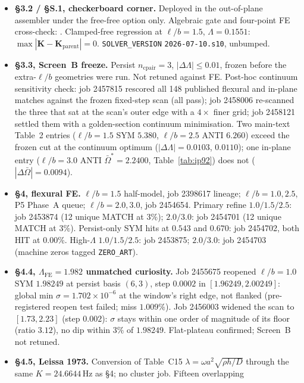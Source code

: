\documentclass[11pt]{article}
\begin{document}
\begin{itemize}\itemsep2pt
\item \textbf{\S3.2 / \S{}S.1, checkerboard corner.} Deployed in the
out-of-plane assembler under the free-free option only. Algebraic gate
and four-point FE cross-check:
. Clamped-free
regression at $\ell/b=1.5$, $\Lambda=0.1551$:
$\max|\mathbf{K}-\mathbf{K}_{\mathrm{parent}}|=0$.
\texttt{SOLVER\_VERSION} \texttt{2026-07-10.s10}, unbumped.
\item \textbf{\S3.3, Screen~B freeze.} Persist $n_{\mathrm{cpair}}=3$,
$|\Delta\Lambda|\le 0.01$, frozen before the extra-$\ell/b$ geometries
were run. Not retuned against FE. Post-hoc continuum sensitivity check:
job 2457815 rescored all 148 published flexural and in-plane matches
against the frozen fixed-step scan (all pass); job 2458006 re-scanned
the three that sat at the scan's outer edge with a $4\times$ finer grid;
job 2458121 settled them with a golden-section continuum minimisation.
Two main-text Table~2 entries ($\ell/b=1.5$ SYM $5.380$,
$\ell/b=2.5$ ANTI $6.260$) exceed the frozen cut at the continuum
optimum ($|\Delta\Lambda|=0.0103$, $0.0110$); one in-plane entry
($\ell/b=3.0$ ANTI $\bar\Omega^{*}=2.2400$, Table~\ref{tab:ip92}) does
not ($|\Delta\bar\Omega|=0.0094$).
\item \textbf{\S4, flexural FE.} $\ell/b=1.5$ half-model, job 2398617
lineage; $\ell/b=1.0,2.5$, P5 Phase~A queue; $\ell/b=2.0,3.0$, job
2454654. Primary refine $1.0/1.5/2.5$: job 2453874 (12 unique MATCH at
$3\%$); $2.0/3.0$: job 2454701 (12 unique MATCH at $3\%$). Persist-only
SYM hits at $0.543$ and $0.670$: job 2454702, both HIT at $0.00\%$.
High-$\Lambda$ $1.0/1.5/2.5$: job 2453875; $2.0/3.0$: job 2454703
(machine zeros tagged \texttt{ZERO\_ART}).
\item \textbf{\S4.4, $\Lambda_{\mathrm{FE}}=1.982$ unmatched
curiosity.} Job 2455675 reopened $\ell/b=1.0$ SYM $1.98249$ at persist
basis $(6,3)$, step $0.0002$ in $[1.96249,2.00249]$: global min
$\sigma=1.702\times 10^{-6}$ at the window's right edge, not flanked
(pre-registered reopen test failed; miss $1.009\%$). Job 2456003 widened
the scan to $[1.73,2.23]$ (step $0.002$): $\sigma$ stays within one
order of magnitude of its floor (ratio $3.12$), no dip within $3\%$ of
$1.98249$. Flat-plateau confirmed; Screen~B not retuned.
\item \textbf{\S4.5, Leissa 1973.} Conversion of Table~C15
$\lambda=\omega a^2\sqrt{\rho h/D}$ through the same
$K=24.6644\,\mathrm{Hz}$ as \S4; no cluster job. Fifteen overlapping

\end{itemize}
\end{document}
